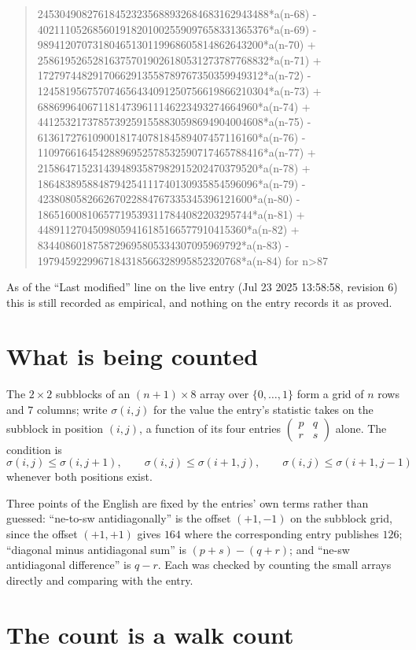 \documentclass[11pt,a4paper]{article}
\theoremstyle{plain}
\theoremstyle{definition}
\begin{document}
\begin{quote}
245304908276184523235688932684683162943488*a(n-68) - 402111052685601918201002559097658331365376*a(n-69) - 98941207073180465130119968605814862643200*a(n-70) + 258619526528163757019026180531273787768832*a(n-71) + 17279744829170662913558789767350359949312*a(n-72) - 124581956757074656434091250756619866210304*a(n-73) + 6886996406711814739611146223493274664960*a(n-74) + 44125321737857392591558830598694904004608*a(n-75) - 6136172761090018174078184589407457116160*a(n-76) - 11097661645428896952578532590717465788416*a(n-77) + 2158647152314394893587982915202470379520*a(n-78) + 1864838958848794254111740130935854596096*a(n-79) - 423808058266267022884767335345396121600*a(n-80) - 186516008106577195393117844082203295744*a(n-81) + 44891127045098059416185166577910415360*a(n-82) + 8344086018758729695805334307095969792*a(n-83) - 1979459229967184318566328995852320768*a(n-84) for n>87
\end{quote}
As of the ``Last modified'' line on the live entry (Jul 23 2025 13:58:58, revision 6) this is still
recorded as empirical, and nothing on the entry records it as proved.

\section{What is being counted}

The $2\times2$ subblocks of an $(n+1)\times8$ array over $\{0,\dots,1\}$ form a grid
of $n$ rows and $7$ columns; write $\sigma(i,j)$ for the value the entry's statistic takes on
the subblock in position $(i,j)$, a function of its four entries
$\begin{pmatrix}p&q\\r&s\end{pmatrix}$ alone. The condition is
\[
\sigma(i,j)\le\sigma(i,j+1),\qquad \sigma(i,j)\le\sigma(i+1,j),\qquad \sigma(i,j)\le\sigma(i+1,j-1)
\]
whenever both positions exist.

Three points of the English are fixed by the entries' own terms rather than guessed:
``ne-to-sw antidiagonally'' is the offset $(+1,-1)$ on the subblock grid, since the offset
$(+1,+1)$ gives $164$ where the corresponding entry publishes $126$; ``diagonal minus
antidiagonal sum'' is $(p+s)-(q+r)$; and ``ne-sw antidiagonal difference'' is $q-r$. Each was
checked by counting the small arrays directly and comparing with the entry.

\section{The count is a walk count}
\end{document}
